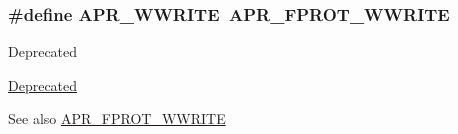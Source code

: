 \subsubsection[{\texorpdfstring{A\+P\+R\+\_\+\+W\+W\+R\+I\+TE}{APR_WWRITE}}]{\setlength{\rightskip}{0pt plus 5cm}\#define A\+P\+R\+\_\+\+W\+W\+R\+I\+TE~{\bf A\+P\+R\+\_\+\+F\+P\+R\+O\+T\+\_\+\+W\+W\+R\+I\+TE}}\hypertarget{group__apr__file__permissions_ga7aac61689e9aaa93176bdb4911f56863}{}\label{group__apr__file__permissions_ga7aac61689e9aaa93176bdb4911f56863}
\begin{DoxyRefDesc}{Deprecated}
\item[\hyperlink{deprecated__deprecated000013}{Deprecated}]\end{DoxyRefDesc}
\begin{DoxySeeAlso}{See also}
\hyperlink{group__apr__file__permissions_ga51692a9828f5b6288d89495378944260}{A\+P\+R\+\_\+\+F\+P\+R\+O\+T\+\_\+\+W\+W\+R\+I\+TE} 
\end{DoxySeeAlso}
